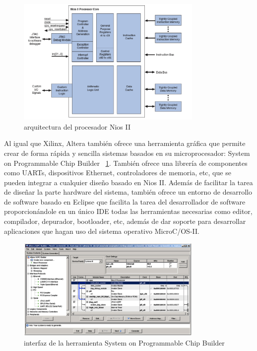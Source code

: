 \begin{figure}[h!]
 	\begin{center}
  	\includegraphics[width=0.8\textwidth,keepaspectratio=true]{./images/nios2}
  	\caption{arquitectura del procesador Nios II}
 	\end{center}
	\end{figure}

Al igual que Xilinx, Altera también ofrece una herramienta gráfica que permite crear de forma rápida y sencilla sistemas basados en su microprocesador: System on Programmable Chip Builder \cite{Etiqueta28}~\ref{fig:System on Programmable Chip Builder}. También ofrece una librería de componentes como UARTs, dispositivos Ethernet, controladores de memoria, etc, que se pueden integrar a cualquier diseño basado en Nios II.
Además de facilitar la tarea de diseñar la parte hardware del sistema, también ofrece un entorno de desarrollo de software basado en Eclipse que facilita la tarea del desarrollador de software proporcionándole en un único IDE todas las herramientas necesarias como editor, compilador, depurador, bootloader, etc, además de dar soporte para desarrollar aplicaciones que hagan uso del sistema operativo MicroC/OS-II.

	\begin{figure}[h!]
 	\begin{center}
  	\includegraphics[width=0.8\textwidth,keepaspectratio=true]{./images/herramientasnios2}
  	\caption{interfaz de la herramienta System on Programmable Chip Builder}
  	\label{fig:System on Programmable Chip Builder}
 	\end{center}
	\end{figure}

